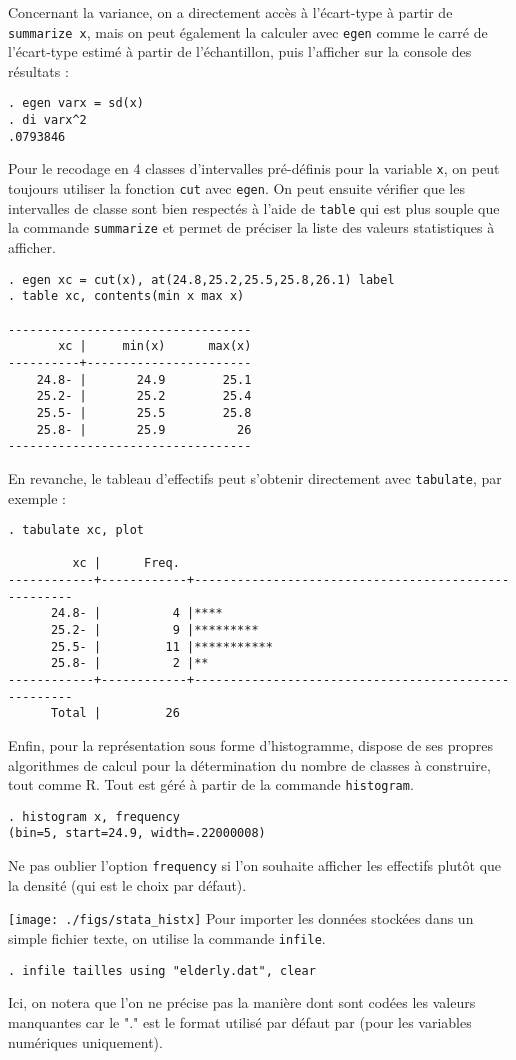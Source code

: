 Concernant la variance, on a directement accès à l'écart-type à partir de 
\verb|summarize x|, mais on peut également la calculer avec \texttt{egen}
comme le carré de l'écart-type estimé à partir de l'échantillon, puis
l'afficher sur la console des résultats :
\begin{verbatim}
. egen varx = sd(x)
. di varx^2
.0793846
\end{verbatim}

Pour le recodage en 4 classes d'intervalles pré-définis pour la variable
\texttt{x}, on peut toujours utiliser la fonction \texttt{cut} avec
\texttt{egen}. On peut ensuite vérifier que les intervalles de classe sont
bien respectés à l'aide de \texttt{table} qui est plus souple que la
commande \texttt{summarize} et permet de préciser la liste des valeurs
statistiques à afficher.
\begin{verbatim}
. egen xc = cut(x), at(24.8,25.2,25.5,25.8,26.1) label
. table xc, contents(min x max x)

----------------------------------
       xc |     min(x)      max(x)
----------+-----------------------
    24.8- |       24.9        25.1
    25.2- |       25.2        25.4
    25.5- |       25.5        25.8
    25.8- |       25.9          26
----------------------------------
\end{verbatim}
En revanche, le tableau d'effectifs peut s'obtenir directement avec
\texttt{tabulate}, par exemple :
\begin{verbatim}
. tabulate xc, plot

         xc |      Freq.
------------+------------+-----------------------------------------------------
      24.8- |          4 |****
      25.2- |          9 |*********
      25.5- |         11 |***********
      25.8- |          2 |**
------------+------------+-----------------------------------------------------
      Total |         26
\end{verbatim}
Enfin, pour la représentation sous forme d'histogramme, \Stata dispose de ses
propres algorithmes de calcul pour la détermination du nombre de classes à
construire, tout comme R. Tout est géré à partir de la commande
\texttt{histogram}. 
\begin{verbatim}
. histogram x, frequency
(bin=5, start=24.9, width=.22000008)
\end{verbatim}
Ne pas oublier l'option \texttt{frequency} si l'on souhaite afficher les
effectifs plutôt que la densité (qui est le choix par défaut).

\texttt{[image: ./figs/stata\_histx]}
%
%
%
\soln{\ref{exo:8.5}} Pour importer les données stockées dans un simple
fichier texte, on utilise la commande \verb|infile|.
\begin{verbatim}
. infile tailles using "elderly.dat", clear
\end{verbatim}
Ici, on notera que l'on ne précise pas la manière dont sont codées les
valeurs manquantes car le "." est le format utilisé par défaut par \Stata
(pour les variables numériques uniquement).

